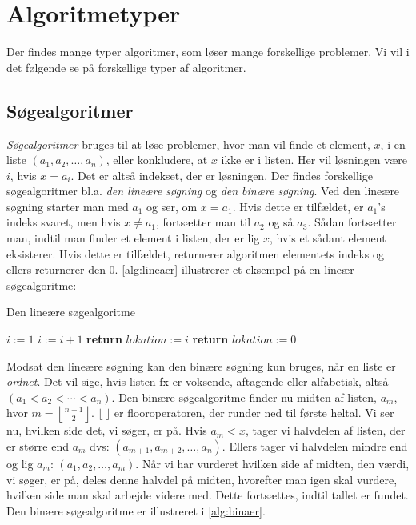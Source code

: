 \section{Algoritmetyper}
Der findes mange typer algoritmer, som løser mange forskellige problemer. Vi vil i det følgende se på forskellige typer af algoritmer.
\subsection{Søgealgoritmer}
\emph{Søgealgoritmer} bruges til at løse problemer, hvor man vil finde et element, $x$, i en liste $(a_{1}, a_{2}, \dotsc, a_{n})$, eller konkludere, at $x$ ikke er i listen. Her vil løsningen være $i$, hvis $x=a_{i}$. Det er altså indekset, der er løsningen. Der findes forskellige søgealgoritmer bl.a. \emph{den lineære søgning} og \emph{den binære søgning}. Ved den lineære søgning starter man med $a_1$ og ser, om $x=a_{1}$. Hvis dette er tilfældet, er $a_{1}$'s indeks svaret, men hvis $x \neq a_{1}$, fortsætter man til $a_{2}$ og så $a_{3}$. Sådan fortsætter man, indtil man finder et element i listen, der er lig $x$, hvis et sådant element eksisterer. Hvis dette er tilfældet, returnerer algoritmen elementets indeks og ellers returnerer den 0. \autoref{alg:lineaer} illustrerer et eksempel på en lineær søgealgoritme:

\begin{algorithm}[H] 
\caption{Den lineære søgealgoritme}
\begin{algorithmic}[1]

    \State $i:=1$
        \State $i:=i+1$
    \EndWhile
    \State \textbf{return} $lokation:=i$
    \Else
    \State \textbf{return} $lokation:=0$
    \EndIf
  \label{roy's loop}
\EndProcedure

\end{algorithmic}
\label{alg:lineaer}
\end{algorithm}


Modsat den lineære søgning kan den binære søgning kun bruges, når en liste er \emph{ordnet}. Det vil sige, hvis listen fx er voksende, aftagende eller alfabetisk, altså $(a_{1}<a_{2}<\dotsb<a_{n})$. Den binære søgealgoritme finder nu midten af listen, $a_{m}$, hvor $m=\left \lfloor \frac{n+1}{2} \right \rfloor$. $\lfloor \ \rfloor$ er flooroperatoren, der runder ned til første heltal. Vi ser nu, hvilken side det, vi søger, er på. Hvis $a_{m}<x$, tager vi halvdelen af listen, der er større end $a_{m}$ dvs: $(a_{m+1}, a_{m+2},\dotsc,a_{n})$. Ellers tager vi halvdelen mindre end og lig $a_{m}$: $(a_{1}, a_{2},\dotsc,a_{m})$. Når vi har vurderet hvilken side af midten, den værdi, vi søger, er på, deles denne halvdel på midten, hvorefter man igen skal vurdere, hvilken side man skal arbejde videre med. Dette fortsættes, indtil tallet er fundet. Den binære søgealgoritme er illustreret i \autoref{alg:binaer}.

